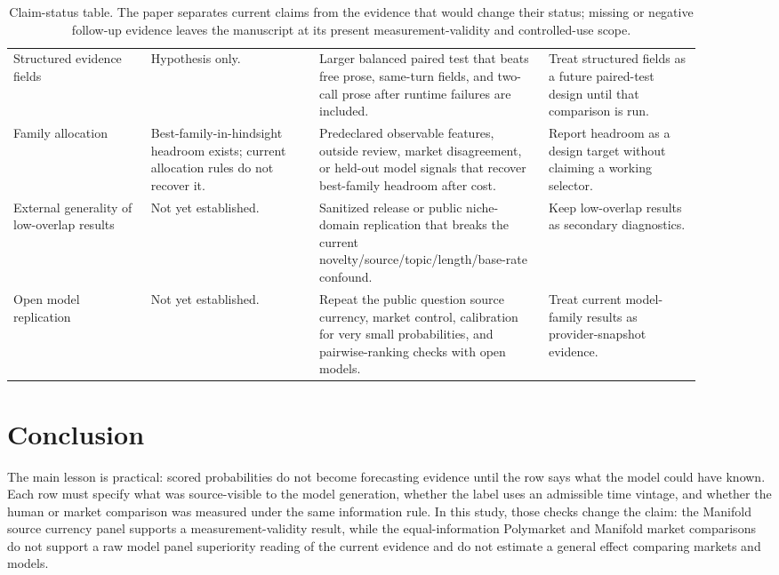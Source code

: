 \documentclass[11pt]{article}
\begin{document}
\begin{table}[p]
\begin{tabular}{@{}L{0.18\linewidth} L{0.22\linewidth} L{0.30\linewidth} L{0.20\linewidth}@{}}
Structured evidence fields & Hypothesis only. & Larger balanced paired test that beats free prose, same-turn fields, and two-call prose after runtime failures are included. & Treat structured fields as a future paired-test design until that comparison is run. \\
Family allocation & Best-family-in-hindsight headroom exists; current allocation rules do not recover it. & Predeclared observable features, outside review, market disagreement, or held-out model signals that recover best-family headroom after cost. & Report headroom as a design target without claiming a working selector. \\
External generality of low-overlap results & Not yet established. & Sanitized release or public niche-domain replication that breaks the current novelty/source/topic/length/base-rate confound. & Keep low-overlap results as secondary diagnostics. \\
Open model replication & Not yet established. & Repeat the public question source currency, market control, calibration for very small probabilities, and pairwise-ranking checks with open models. & Treat current model-family results as provider-snapshot evidence. \\
\bottomrule
\end{tabular}
\endgroup
\caption{Claim-status table. The paper separates current claims from the evidence that would change their status; missing or negative follow-up evidence leaves the manuscript at its present measurement-validity and controlled-use scope.}
\label{tab:next-tests}
\end{table}

\section{Conclusion}
\label{sec:conclusion}

The main lesson is practical: scored probabilities do not become forecasting evidence until the row says what the model could have known. Each row must specify what was source-visible to the model generation, whether the label uses an admissible time vintage, and whether the human or market comparison was measured under the same information rule. In this study, those checks change the claim: the Manifold source currency panel supports a measurement-validity result, while the equal-information Polymarket and Manifold market comparisons do not support a raw model panel superiority reading of the current evidence and do not estimate a general effect comparing markets and models.
\end{document}
